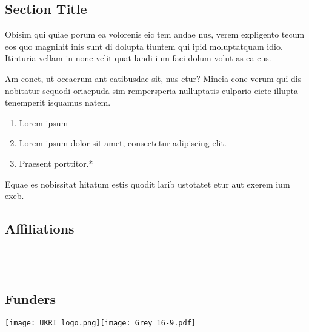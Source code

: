 \documentclass[
	landscape,       %
]{ImperialPoster}
\begin{document}
\begin{multicols}{4}
	\section{Section Title}

	\begingroup
		\small %
		Obisim qui quiae porum ea volorenis eic tem andae nus, verem expligento tecum eos quo magnihit inis sunt di dolupta tiuntem qui ipid moluptatquam idio. Itinturia vellam in none velit quat landi ium faci dolum volut as ea cus.

		Am conet, ut occaerum ant eatibusdae sit, nus etur? Mincia cone verum qui dis nobitatur sequodi oriaepuda sim rempersperia nulluptatis culpario eicte illupta tenemperit isquamus natem.\par
	\endgroup


	\begin{enumerate}
		\item Lorem ipsum
		\item Lorem ipsum dolor sit amet, consectetur adipiscing elit.
		\item Praesent porttitor.*
	\end{enumerate}



	Equae es nobissitat hitatum estis quodit larib ustotatet etur aut exerem ium exeb.

	\subsection{Affiliations}

	\\
	\\

	\subsection{Funders}

	\texttt{[image: UKRI\_logo.png]}\hfill\texttt{[image: Grey\_16-9.pdf]} %


\end{multicols}
\end{document}
